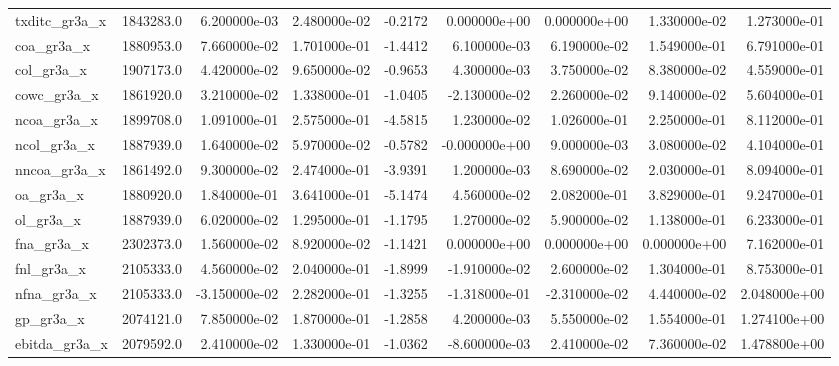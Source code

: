 \documentclass[12pt]{article}
\begin{document}
\begin{landscape}
\begin{longtable}{|l|r|r|r|r|r|r|r|r|}
txditc\_gr3a\_x           &  1843283.0 &  6.200000e-03 &  2.480000e-02 &     -0.2172 &  0.000000e+00 &  0.000000e+00 &  1.330000e-02 &  1.273000e-01 \\
coa\_gr3a\_x              &  1880953.0 &  7.660000e-02 &  1.701000e-01 &     -1.4412 &  6.100000e-03 &  6.190000e-02 &  1.549000e-01 &  6.791000e-01 \\
col\_gr3a\_x              &  1907173.0 &  4.420000e-02 &  9.650000e-02 &     -0.9653 &  4.300000e-03 &  3.750000e-02 &  8.380000e-02 &  4.559000e-01 \\
cowc\_gr3a\_x             &  1861920.0 &  3.210000e-02 &  1.338000e-01 &     -1.0405 & -2.130000e-02 &  2.260000e-02 &  9.140000e-02 &  5.604000e-01 \\
ncoa\_gr3a\_x             &  1899708.0 &  1.091000e-01 &  2.575000e-01 &     -4.5815 &  1.230000e-02 &  1.026000e-01 &  2.250000e-01 &  8.112000e-01 \\
ncol\_gr3a\_x             &  1887939.0 &  1.640000e-02 &  5.970000e-02 &     -0.5782 & -0.000000e+00 &  9.000000e-03 &  3.080000e-02 &  4.104000e-01 \\
nncoa\_gr3a\_x            &  1861492.0 &  9.300000e-02 &  2.474000e-01 &     -3.9391 &  1.200000e-03 &  8.690000e-02 &  2.030000e-01 &  8.094000e-01 \\
oa\_gr3a\_x               &  1880920.0 &  1.840000e-01 &  3.641000e-01 &     -5.1474 &  4.560000e-02 &  2.082000e-01 &  3.829000e-01 &  9.247000e-01 \\
ol\_gr3a\_x               &  1887939.0 &  6.020000e-02 &  1.295000e-01 &     -1.1795 &  1.270000e-02 &  5.900000e-02 &  1.138000e-01 &  6.233000e-01 \\
fna\_gr3a\_x              &  2302373.0 &  1.560000e-02 &  8.920000e-02 &     -1.1421 &  0.000000e+00 &  0.000000e+00 &  0.000000e+00 &  7.162000e-01 \\
fnl\_gr3a\_x              &  2105333.0 &  4.560000e-02 &  2.040000e-01 &     -1.8999 & -1.910000e-02 &  2.600000e-02 &  1.304000e-01 &  8.753000e-01 \\
nfna\_gr3a\_x             &  2105333.0 & -3.150000e-02 &  2.282000e-01 &     -1.3255 & -1.318000e-01 & -2.310000e-02 &  4.440000e-02 &  2.048000e+00 \\
gp\_gr3a\_x               &  2074121.0 &  7.850000e-02 &  1.870000e-01 &     -1.2858 &  4.200000e-03 &  5.550000e-02 &  1.554000e-01 &  1.274100e+00 \\
ebitda\_gr3a\_x           &  2079592.0 &  2.410000e-02 &  1.330000e-01 &     -1.0362 & -8.600000e-03 &  2.410000e-02 &  7.360000e-02 &  1.478800e+00 \\

\end{longtable}
\end{landscape}
\end{document}
